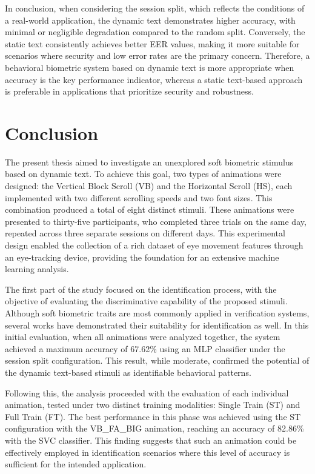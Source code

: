 \documentclass[12pt]{report}
\begin{document}
In conclusion, when considering the session split, which reflects the conditions of a real-world application, the dynamic text demonstrates higher accuracy, with minimal or negligible degradation compared to the random split.
Conversely, the static text consistently achieves better EER values, making it more suitable for scenarios where security and low error rates are the primary concern.
Therefore, a behavioral biometric system based on dynamic text is more appropriate when accuracy is the key performance indicator, whereas a static text-based approach is preferable in applications that prioritize security and robustness.

\FloatBarrier
\newpage

\chapter{Conclusion}

The present thesis aimed to investigate an unexplored soft biometric stimulus based on dynamic text. 
To achieve this goal, two types of animations were designed: the Vertical Block Scroll (VB) and the Horizontal Scroll (HS), each implemented with two different scrolling speeds and two font sizes.
This combination produced a total of eight distinct stimuli. 
These animations were presented to thirty-five participants, who completed three trials on the same day, repeated across three separate sessions on different days. 
This experimental design enabled the collection of a rich dataset of eye movement features through an eye-tracking device, providing the foundation for an extensive machine learning analysis.

The first part of the study focused on the identification process, with the objective of evaluating the discriminative capability of the proposed stimuli. 
Although soft biometric traits are most commonly applied in verification systems, several works have demonstrated their suitability for identification as well. 
In this initial evaluation, when all animations were analyzed together, the system achieved a maximum accuracy of 67.62\% using an MLP classifier under the session split configuration. 
This result, while moderate, confirmed the potential of the dynamic text-based stimuli as identifiable behavioral patterns.

Following this, the analysis proceeded with the evaluation of each individual animation, tested under two distinct training modalities: Single Train (ST) and Full Train (FT). 
The best performance in this phase was achieved using the ST configuration with the VB\_FA\_BIG animation, reaching an accuracy of 82.86\% with the SVC classifier. 
This finding suggests that such an animation could be effectively employed in identification scenarios where this level of accuracy is sufficient for the intended application.
\end{document}
